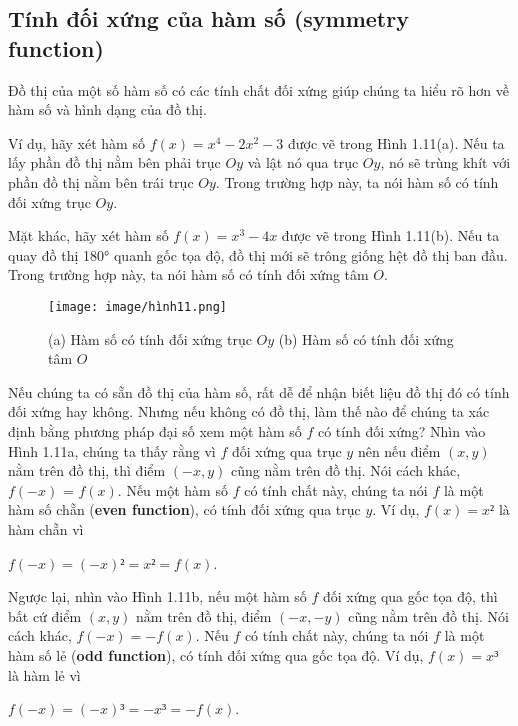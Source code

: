 \documentclass[a4paper,12pt,openany]{book}
\begin{document}
\clearpage
\subsection{Tính đối xứng của hàm số (symmetry function)}

Đồ thị của một số hàm số có các tính chất đối xứng giúp chúng ta hiểu rõ hơn về hàm số và hình dạng của đồ thị.
\par
\vspace{10pt}
Ví dụ, hãy xét hàm số $f(x) = x^4 - 2x^2 - 3$ được vẽ trong Hình 1.11(a). Nếu ta lấy phần đồ thị nằm bên phải trục $Oy$ và lật nó qua trục $Oy$, nó sẽ trùng khít với phần đồ thị nằm bên trái trục $Oy$. Trong trường hợp này, ta nói hàm số có tính đối xứng trục $Oy$.
\par
\vspace{10pt}
Mặt khác, hãy xét hàm số $f(x) = x^3 - 4x$ được vẽ trong Hình 1.11(b). Nếu ta quay đồ thị 180° quanh gốc tọa độ, đồ thị mới sẽ trông giống hệt đồ thị ban đầu. Trong trường hợp này, ta nói hàm số có tính đối xứng tâm $O$.

\begin{figure}[H]
    \centering
    \texttt{[image: image/hình11.png]}
    \caption{(a) Hàm số có tính đối xứng trục $Oy$ (b) Hàm số có tính đối xứng tâm $O$  }
    \label{fig:enter-label}
\end{figure}

Nếu chúng ta có sẵn đồ thị của hàm số, rất dễ để nhận biết liệu đồ thị đó có tính đối xứng hay không. Nhưng nếu không có đồ thị, làm thế nào để chúng ta xác định bằng phương pháp đại số xem một hàm số $f$ có tính đối xứng? Nhìn vào Hình 1.11a, chúng ta thấy rằng vì $f$ đối xứng qua trục $y$ nên nếu điểm $(x, y)$ nằm trên đồ thị, thì điểm $(-x, y)$ cũng nằm trên đồ thị. Nói cách khác, $f(-x)$ = $f(x)$. Nếu một hàm số $f$ có tính chất này, chúng ta nói $f$ là một hàm số chẵn (\textbf{even function}), có tính đối xứng qua trục $y$. Ví dụ, $f(x) = x²$ là hàm chẵn vì
\begin{center}
    $f(-x) = (-x)² = x² = f(x)$.
\end{center}

Ngược lại, nhìn vào Hình 1.11b, nếu một hàm số $f$ đối xứng qua gốc tọa độ, thì bất cứ điểm $(x, y)$ nằm trên đồ thị, điểm $(-x, -y)$ cũng nằm trên đồ thị. Nói cách khác, $f(-x) = -f(x)$. Nếu $f$ có tính chất này, chúng ta nói $f$ là một hàm số lẻ (\textbf{odd function}), có tính đối xứng qua gốc tọa độ. Ví dụ, $f(x) = x³$ là hàm lẻ vì
\begin{center}
    $f(-x) = (-x)³ = -x³ = -f(x)$.
\end{center}
\end{document}
